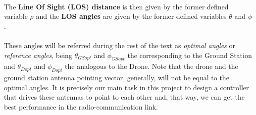 \paragraph{} The \textbf{Line Of Sight (LOS) distance} is then given by the former defined variable $\rho$ and the \textbf{LOS angles} are given by the former defined variables $\theta$ and $\phi$.
\paragraph{} These angles will be referred during the rest of the text as \textit{optimal angles} or \textit{reference angles}, being $\theta_{GSopt}$ and $\phi_{GSopt}$ the corresponding to the Ground Station and $\theta_{Dopt}$ and $\phi_{Dopt}$ the analogous to the Drone.
Note that the drone and the ground station antenna pointing vector, generally, will not be equal to the optimal angles. It is precisely our main task in this project to design a controller that drives these antennas to point to each other and, that way, we can get the best performance in the radio-communication link.


%     

%     
